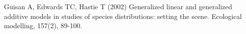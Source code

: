 Guisan A, Edwards TC, Hastie T (2002) Generalized linear and generalized additive models in studies of species distributions: setting the scene. Ecological modelling, 157(2), 89-100.